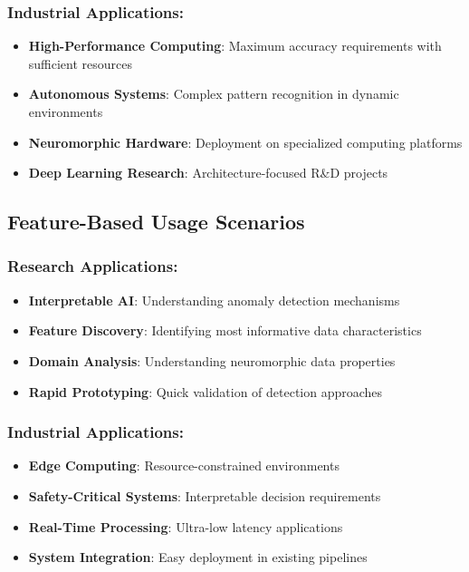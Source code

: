 \documentclass[11pt,a4paper]{article}
\begin{document}
\subsubsection{Industrial Applications:}
\begin{itemize}
    \item \textbf{High-Performance Computing}: Maximum accuracy requirements with sufficient resources
    \item \textbf{Autonomous Systems}: Complex pattern recognition in dynamic environments
    \item \textbf{Neuromorphic Hardware}: Deployment on specialized computing platforms
    \item \textbf{Deep Learning Research}: Architecture-focused R\&D projects
\end{itemize}

\subsection{Feature-Based Usage Scenarios}

\subsubsection{Research Applications:}
\begin{itemize}
    \item \textbf{Interpretable AI}: Understanding anomaly detection mechanisms
    \item \textbf{Feature Discovery}: Identifying most informative data characteristics
    \item \textbf{Domain Analysis}: Understanding neuromorphic data properties
    \item \textbf{Rapid Prototyping}: Quick validation of detection approaches
\end{itemize}

\subsubsection{Industrial Applications:}
\begin{itemize}
    \item \textbf{Edge Computing}: Resource-constrained environments
    \item \textbf{Safety-Critical Systems}: Interpretable decision requirements
    \item \textbf{Real-Time Processing}: Ultra-low latency applications
    \item \textbf{System Integration}: Easy deployment in existing pipelines
\end{itemize}
\end{document}
